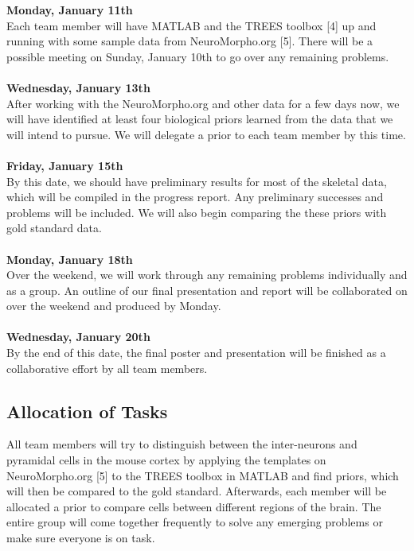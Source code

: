 \documentclass[11pt]{article} %
\begin{document}
\textbf{Monday, January 11th}\\
Each team member will have MATLAB and the TREES toolbox [4] up and running with some sample data from NeuroMorpho.org [5]. There will be a possible meeting on Sunday, January 10th to go over any remaining problems.\\
\\
\textbf{Wednesday, January 13th} \\
After working with the NeuroMorpho.org and other data for a few days now, we will have identified at least four biological priors learned from the data that we will intend to pursue. We will delegate a prior to each team member by this time.\\
\\
\textbf{Friday, January 15th}\\
By this date, we should have preliminary results for most of the skeletal data, which will be compiled in the progress report. Any preliminary successes and problems will be included. We will also begin comparing the these priors with gold standard data.\\
\\
\textbf{Monday, January 18th} \\
Over the weekend, we will work through any remaining problems individually and as a group. An outline of our final presentation and report will be collaborated on over the weekend and produced by Monday.\\
\\
\textbf{Wednesday, January 20th}\\
By the end of this date, the final poster and presentation will be finished as a collaborative effort by all team members.

\subsection{Allocation of Tasks}
All team members will try to distinguish between the inter-neurons and pyramidal cells in the mouse cortex by applying the templates on NeuroMorpho.org [5] to the TREES toolbox in MATLAB and find priors, which will then be compared to the gold standard. Afterwards, each member will be allocated a prior to compare cells between different regions of the brain. The entire group will come together frequently to solve any emerging problems or make sure everyone is on task.
\end{document}
